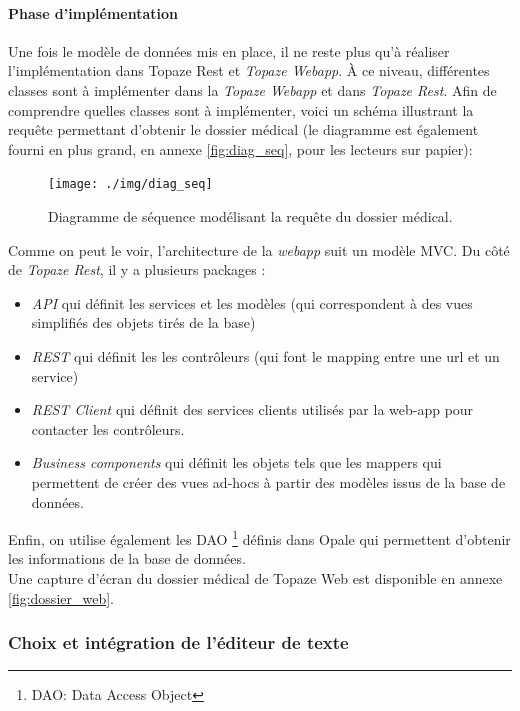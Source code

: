 \paragraph{Phase d'implémentation\\}
Une fois le modèle de données mis en place, il ne reste plus qu'à réaliser l'implémentation dans Topaze Rest et \textit{Topaze Webapp}. 
À ce niveau, différentes classes sont à implémenter dans la \textit{Topaze Webapp} et dans \textit{Topaze Rest}. Afin de comprendre quelles classes sont à implémenter, voici un schéma illustrant la requête permettant d'obtenir le dossier médical (le diagramme est également fourni en plus grand, en annexe \ref{fig:diag_seq}, pour les lecteurs sur papier):
\begin{figure}[H]
  \centering
  \texttt{[image: ./img/diag\_seq]}
  \caption{\label{fig:mb_va_ast} Diagramme de séquence modélisant la requête du dossier médical.}
\end{figure}

Comme on peut le voir, l'architecture de la \textit{webapp} suit un modèle MVC. Du côté de \textit{Topaze Rest}, il y a plusieurs packages : 
\begin{itemize} 
\item \textit{API} qui définit les services et les modèles (qui correspondent à des vues simplifiés des objets tirés de la base)
\item \textit{REST} qui définit les les contrôleurs (qui font le mapping entre une url et un service)
\item \textit{REST Client} qui définit des services clients utilisés par la web-app pour contacter les contrôleurs.
\item \textit{Business components} qui définit les objets tels que les mappers qui permettent de créer des vues ad-hocs à partir des modèles issus de la base de données.
\end{itemize}

Enfin, on utilise également les DAO \footnote{DAO: Data Access Object} définis dans Opale qui permettent d'obtenir les informations de la base de données.\\

Une capture d'écran du dossier médical de Topaze Web est disponible en annexe \ref{fig:dossier_web}.

\subsubsection{Choix et intégration de l'éditeur de texte}\label{editeur_section}

